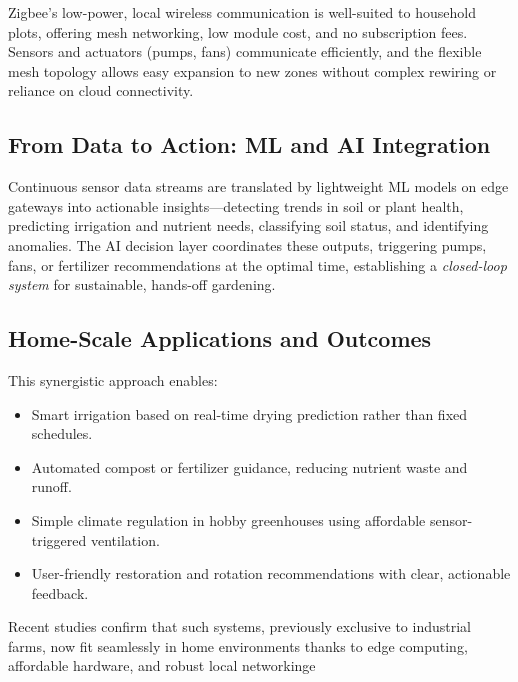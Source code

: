 \documentclass{sigchi}
\begin{document}
Zigbee’s low-power, local wireless communication is well-suited to household plots, offering mesh networking, low module cost, and no subscription fees. Sensors and actuators (pumps, fans) communicate efficiently, and the flexible mesh topology allows easy expansion to new zones without complex rewiring or reliance on cloud connectivity.

\subsection{From Data to Action: ML and AI Integration}

Continuous sensor data streams are translated by lightweight ML models on edge gateways into actionable insights—detecting trends in soil or plant health, predicting irrigation and nutrient needs, classifying soil status, and identifying anomalies. The AI decision layer coordinates these outputs, triggering pumps, fans, or fertilizer recommendations at the optimal time, establishing a \emph{closed-loop system} for sustainable, hands-off gardening.

\subsection{Home-Scale Applications and Outcomes}

This synergistic approach enables:
\begin{itemize}
	\item Smart irrigation based on real-time drying prediction rather than fixed schedules.
	\item Automated compost or fertilizer guidance, reducing nutrient waste and runoff.
	\item Simple climate regulation in hobby greenhouses using affordable sensor-triggered ventilation.
	\item User-friendly restoration and rotation recommendations with clear, actionable feedback.
\end{itemize}
Recent studies confirm that such systems, previously exclusive to industrial farms, now fit seamlessly in home environments thanks to edge computing, affordable hardware, and robust local networkinge
\end{document}
